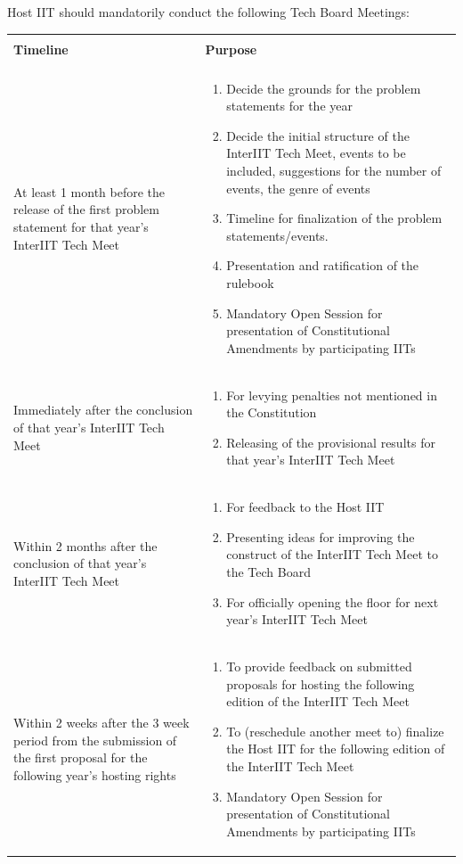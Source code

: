 Host IIT should mandatorily conduct the following Tech Board Meetings:
\newpage
\begin{center}
\renewcommand\cellgape{\Gape[2pt]} %
\begin{longtable}{m{5cm} m{10cm}}
\hline
\\[-3pt]
\textbf{Timeline} & \textbf{Purpose}\\[4pt]
\hline
\\[-1pt]
At least 1 month before the release of the first problem statement for that year’s InterIIT Tech Meet &
\begin{enumerate}
    \item Decide the grounds for the problem statements for the year
    \item Decide the initial structure of the InterIIT Tech Meet, events to be included, suggestions for the number of events, the genre of events
    \item Timeline for finalization of the problem statements/events.
    \item Presentation and ratification of the rulebook
    \item Mandatory Open Session for presentation of Constitutional Amendments by participating IITs
\end{enumerate}
\\
\hline
Immediately after the conclusion of that year’s InterIIT Tech Meet &
\begin{enumerate}
    \item For levying penalties not mentioned in the Constitution
    \item Releasing of the provisional results for that year’s InterIIT Tech Meet
\end{enumerate}
\\
\hline
Within 2 months after the conclusion of that year’s InterIIT Tech Meet &
\begin{enumerate}
    \item For feedback to the Host IIT
    \item Presenting ideas for improving the construct of the InterIIT Tech Meet to the Tech Board
    \item For officially opening the floor for next year’s InterIIT Tech Meet
\end{enumerate}
\\
\hline
Within 2 weeks after the 3 week period from the submission of the first proposal for the following year’s hosting rights &
\begin{enumerate}
    \item To provide feedback on submitted proposals for hosting the following edition of the InterIIT Tech Meet
    \item To (reschedule another meet to) finalize the Host IIT for the following edition of the InterIIT Tech Meet
    \item Mandatory Open Session for presentation of Constitutional Amendments by participating IITs

\end{enumerate}
\\

\hline
\end{longtable}
\end{center}
